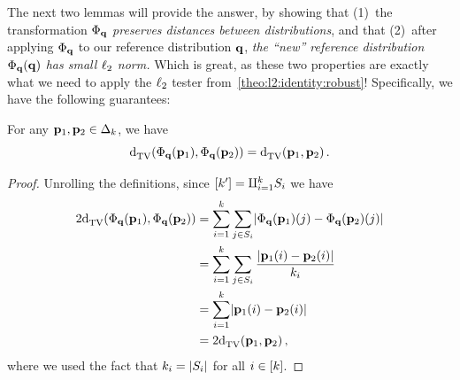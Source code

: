 The next two lemmas will provide the answer, by showing that (1)~the transformation $\Phi_\q$ \emph{preserves distances between distributions}, and that (2)~after applying $\Phi_\q$ to our reference distribution $\q$, \emph{the ``new'' reference distribution $\Phi_\q(\q)$ has small $\lp[2]$ norm.} Which is great, as these two properties are exactly what we need to apply the $\lp[2]$ tester from~\cref{theo:l2:identity:robust}!  Specifically, we have the following guarantees:
\begin{lemma}
	\label{lemma:l2:reduction:distances}
	For any $\p_1,\p_2\in\distribs{\ab}$, we have
	\[	
		\totalvardist{\Phi_\q(\p_1)}{\Phi_\q(\p_2)} = \totalvardist{\p_1}{\p_2}\,.
	\]
\end{lemma}
\begin{proof}
Unrolling the definitions, since $[\ab'] = \disjunion_{i=1}^\ab S_i$ we have
\begin{align*}
	2\totalvardist{\Phi_\q(\p_1)}{\Phi_\q(\p_2)}
	&= \sum_{i=1}^{\ab} \sum_{j\in S_i} \abs{\Phi_\q(\p_1)(j)-\Phi_\q(\p_2)(j)} \\
	&= \sum_{i=1}^{\ab} \sum_{j\in S_i} \frac{\abs{\p_1(i)-\p_2(i)}}{\ab_i}\\
	&= \sum_{i=1}^{\ab} \abs{\p_1(i)-\p_2(i)} \\
	&= 2\totalvardist{\p_1}{\p_2}\,,
\end{align*}
where we used the fact that $\ab_i = |S_i|$ for all $i\in[\ab]$.
\end{proof}

